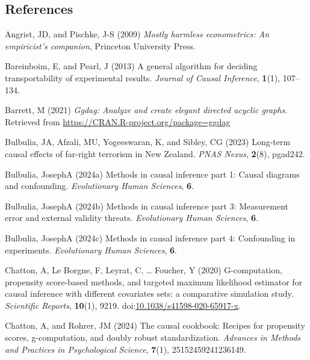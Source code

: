 \documentclass[
  single column]{article}
\newlength{\cslhangindent}
\newenvironment{CSLReferences}[2] %
 {\begin{list}{}{%
  \setlength{\itemindent}{0pt}
  \setlength{\leftmargin}{0pt}
  \setlength{\parsep}{0pt}
  \ifodd #1
   \setlength{\leftmargin}{\cslhangindent}
   \setlength{\itemindent}{-1\cslhangindent}
  \fi
  \setlength{\itemsep}{#2\baselineskip}}}
 {\end{list}}
\begin{document}
\subsection{References}\label{references}

\label{refs}
\begin{CSLReferences}{1}{0}
Angrist, JD, and Pischke, J-S (2009) \emph{Mostly harmless econometrics:
An empiricist's companion}, Princeton University Press.

Bareinboim, E, and Pearl, J (2013) A general algorithm for deciding
transportability of experimental results. \emph{Journal of Causal
Inference}, \textbf{1}(1), 107--134.

Barrett, M (2021) \emph{Ggdag: Analyze and create elegant directed
acyclic graphs}. Retrieved from
\url{https://CRAN.R-project.org/package=ggdag}

Bulbulia, JA, Afzali, MU, Yogeeswaran, K, and Sibley, CG (2023)
Long-term causal effects of far-right terrorism in {N}ew {Z}ealand.
\emph{PNAS Nexus}, \textbf{2}(8), pgad242.

Bulbulia, JosephA (2024a) Methods in causal inference part 1: Causal
diagrams and confounding. \emph{Evolutionary Human Sciences},
\textbf{6}.

Bulbulia, JosephA (2024b) Methods in causal inference part 3:
Measurement error and external validity threats. \emph{Evolutionary
Human Sciences}, \textbf{6}.

Bulbulia, JosephA (2024c) Methods in causal inference part 4:
Confounding in experiments. \emph{Evolutionary Human Sciences},
\textbf{6}.

Chatton, A, Le Borgne, F, Leyrat, C, \ldots{} Foucher, Y (2020)
G-computation, propensity score-based methods, and targeted maximum
likelihood estimator for causal inference with different covariates
sets: a comparative simulation study. \emph{Scientific Reports},
\textbf{10}(1), 9219.
doi:\href{https://doi.org/10.1038/s41598-020-65917-x}{10.1038/s41598-020-65917-x}.

Chatton, A, and Rohrer, JM (2024) The causal cookbook: Recipes for
propensity scores, g-computation, and doubly robust standardization.
\emph{Advances in Methods and Practices in Psychological Science},
\textbf{7}(1), 25152459241236149.


\end{CSLReferences}
\end{document}
